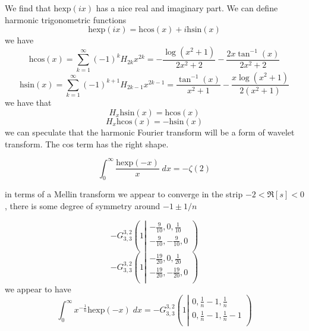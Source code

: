 \documentclass{article}
\begin{document}
We find that $\textrm{hexp}(i x)$ has a nice real and imaginary part. We can define harmonic trigonometric functions
$$
\textrm{hexp}(i x) = \textrm{hcos}(x) + i \textrm{hsin}(x) 
$$
we have 
$$
\textrm{hcos}(x) = \sum_{k=1}^\infty (-1)^k H_{2k} x^{2k} = -\frac{\log \left(x^2+1\right)}{2 x^2+2}-\frac{2 x \tan ^{-1}(x)}{2 x^2+2}
$$
$$
\textrm{hsin}(x) = \sum_{k=1}^\infty (-1)^{k+1} H_{2k-1} x^{2k-1} = \frac{\tan ^{-1}(x)}{x^2+1}-\frac{x \log \left(x^2+1\right)}{2 \left(x^2+1\right)}
$$
we have that 
$$
H_x \textrm{hsin}(x) = \textrm{hcos}(x)
$$
$$
H_x \textrm{hcos}(x) = -\textrm{hsin}(x)
$$
we can speculate that the harmonic Fourier transform will be a form of wavelet transform. The cos term has the right shape.

$$
\int_0^\infty \frac{\textrm{hexp}(-x)}{x} \; dx = - \zeta(2)
$$

in terms of a Mellin transform we appear to converge in the strip $-2<\Re{[s]}<0$, there is some degree of symmetry around $-1\pm 1/n$

$$
-G_{3,3}^{3,2}\left(1\left|
                   \begin{array}{c}
                    -\frac{9}{10},0,\frac{1}{10} \\
                    -\frac{9}{10},-\frac{9}{10},0 \\
                   \end{array}
                   \right.\right)
$$
$$
 -G_{3,3}^{3,2}\left(1\left|
                   \begin{array}{c}
                    -\frac{19}{20},0,\frac{1}{20} \\
                    -\frac{19}{20},-\frac{19}{20},0 \\
                   \end{array}
                   \right.\right)
$$
we appear to have 
$$
\int_0^\infty x^{-\frac{1}{n}}\textrm{hexp}(-x) \; dx = -G_{3,3}^{3,2}\left(1\left|
                   \begin{array}{c}
                    0,\frac{1}{n}-1,\frac{1}{n} \\
                    0,\frac{1}{n}-1,\frac{1}{n}-1 \\
                   \end{array}
                   \right.\right)
$$
\end{document}
